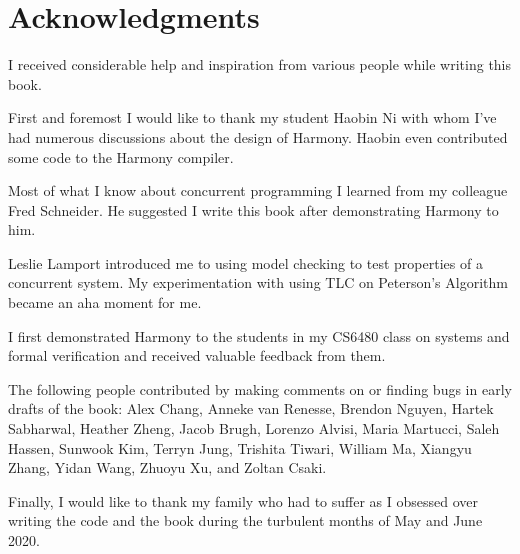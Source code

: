 \documentclass{report}
\begin{document}
\cleardoublepage
{}
{}
\chapter*{Acknowledgments}

I received considerable help and inspiration from various people
while writing this book.

First and foremost I would like to thank my student Haobin Ni with
whom I've had numerous discussions about the design of Harmony.
Haobin even contributed some code to the Harmony compiler.

Most of what I know about concurrent programming I learned from
my colleague Fred Schneider.  He suggested I write this book after
demonstrating Harmony to him.

Leslie Lamport introduced me to using model checking to test properties
of a concurrent system.  My experimentation with using TLC on Peterson's
Algorithm became an aha moment for me.

I first demonstrated Harmony to the students in my CS6480 class on systems
and formal verification and
received valuable feedback from them.

The following people contributed by making comments on or finding bugs in
early drafts of the book:
Alex Chang,
Anneke van Renesse,
Brendon Nguyen,
Hartek Sabharwal,
Heather Zheng,
Jacob Brugh,
Lorenzo Alvisi,
Maria Martucci,
Saleh Hassen,
Sunwook Kim,
Terryn Jung,
Trishita Tiwari,
William Ma,
Xiangyu Zhang,
Yidan Wang,
Zhuoyu Xu,
and
Zoltan Csaki.

Finally, I would like to thank my family who had to suffer as I obsessed
over writing the code and the book during the turbulent months of
May and June 2020.


\cleardoublepage
{}
\printindex

\cleardoublepage
{}
\printglossaries
\end{document}
